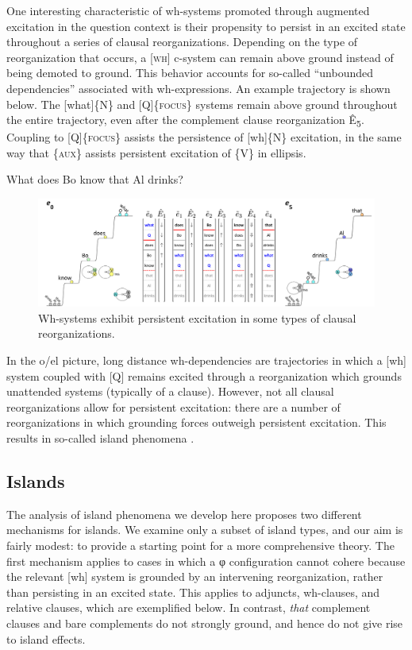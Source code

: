   One interesting characteristic of wh-systems promoted through augmented excitation in the question context is their propensity to persist in an excited state throughout a series of clausal reorganizations. Depending on the type of reorganization that occurs, a [\textsc{wh}] c-system can remain above ground instead of being demoted to ground. This behavior accounts for so-called “unbounded dependencies” associated with wh-expressions. An example trajectory is shown below. The [what]\{N\} and [Q]\{\textsc{focus}\} systems remain above ground throughout the entire trajectory, even after the complement clause reorganization Ê\textsubscript{5}. Coupling to  [Q]\{\textsc{focus}\} assists the persistence of [wh]\{N\} excitation, in the same way that \{\textsc{aux}\} assists persistent excitation of \{V\} in ellipsis. 

  \ea
    {What does Bo know that Al drinks?}
\z
  
\begin{figure}
\includegraphics[width=\textwidth]{figures/Tilsen-img162.png}
\caption{Wh-systems exhibit persistent excitation in some types of clausal reorganizations.}
\label{fig:7:18}
\end{figure}
 

  In the o/el picture, long distance wh-dependencies are trajectories in which a [wh] system coupled with [Q] remains excited through a reorganization which grounds unattended systems (typically of a clause). However, not all clausal reorganizations allow for persistent excitation: there are a number of reorganizations in which grounding forces outweigh persistent excitation. This results in so-called island phenomena \citep{Ross1967}.

\subsection{Islands}

The analysis of island phenomena we develop here proposes two different mechanisms for islands. We examine only a subset of island types, and our aim is fairly modest: to provide a starting point for a more comprehensive theory. The first mechanism applies to cases in which a φ configuration cannot cohere because the relevant [wh] system is grounded by an intervening reorganization, rather than persisting in an excited state. This applies to adjuncts, wh-clauses, and relative clauses, which are exemplified below. In contrast, \textit{that} complement clauses and bare complements do not strongly ground, and hence do not give rise to island effects.

